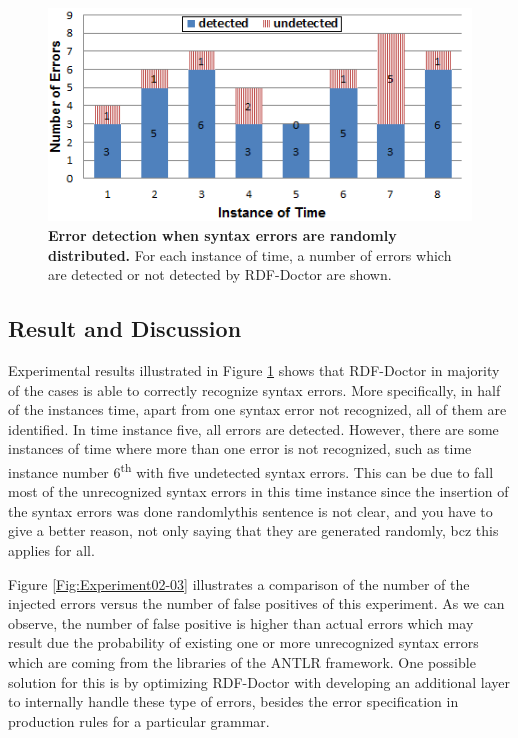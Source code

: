 	\begin{figure}[ht]
	\begin{center}
		\includegraphics[scale=0.9,angle=0]{images/Experiment02-02.png}
		\caption{\textbf{Error detection when syntax errors are randomly distributed.} 
		For each instance of time, a number of errors which are detected or not detected by RDF-Doctor are shown.
		} 
		\label{Fig:Experiment02-02}
	\end{center}
\end{figure}

\subsection{Result and Discussion}

Experimental results illustrated in Figure \ref{Fig:Experiment02-02} shows that RDF-Doctor in majority of the cases is able to correctly recognize syntax errors. 
More specifically, in half of the instances time, apart from one syntax error not recognized, all of them are identified.
In time instance five, all errors are detected.
However, there are some instances of time where more than one error is not recognized, such as time instance number 6\textsuperscript{th} with five undetected syntax errors.
This can be due to fall most of the unrecognized syntax errors in this time instance since the insertion of the syntax errors was done randomly{this sentence is not clear, and you have to give a better reason, not only saying that they are generated randomly, bcz this applies for all}.

Figure \ref{Fig:Experiment02-03} illustrates a comparison of the number of the injected errors versus the number of false positives of this experiment. 
As we can observe, the number of false positive is higher than actual errors which may result due the probability of existing one or more unrecognized syntax errors which are coming from the libraries of the ANTLR framework. 
One possible solution for this is by optimizing RDF-Doctor with developing an additional layer to internally handle these type of errors, besides the error specification in production rules for a particular grammar.

